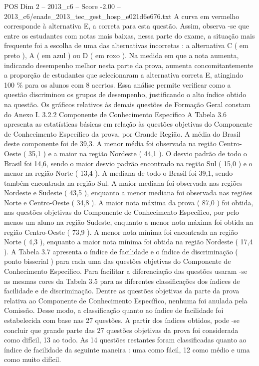\begin{textsample}{POS Dim 2 – 2013\_c6 – Score -2.00 – 2013\_c6/enade\_2013\_tec\_gest\_hosp\_e021d6e676.txt}
A curva em vermelho corresponde à alternativa E, a correta para esta questão.
Assim, observa -se que entre os estudantes com notas mais baixas, nessa parte do exame, a situação mais frequente foi a escolha de uma das alternativas incorretas : a alternativa C ( em preto ), A ( em azul ) ou D ( em roxo ).
Na medida em que a nota aumenta, indicando desempenho melhor nesta parte da prova, aumenta concomitantemente a proporção de estudantes que selecionaram a alternativa correta E, atingindo 100 \% para os alunos com 8 acertos.
Essa análise permite verificar como a questão discriminou os grupos de desempenho, justificando o alto índice obtido na questão.
Os gráficos relativos às demais questões de Formação Geral constam do Anexo I. 3.2.2 Componente de Conhecimento Específico A Tabela 3.6 apresenta as estatísticas básicas em relação às questões objetivas do Componente de Conhecimento Específico da prova, por Grande Região.
A média do Brasil deste componente foi de 39,3.
A menor média foi observada na região Centro-Oeste ( 35,1 ) e a maior na região Nordeste ( 44,1 ).
O desvio padrão de todo o Brasil foi 14,6, sendo o maior desvio padrão encontrado na região Sul ( 15,0 ) e o menor na região Norte ( 13,4 ).
A mediana de todo o Brasil foi 39,1, sendo também encontrada na região Sul.
A maior mediana foi observada nas regiões Nordeste e Sudeste ( 43,5 ), enquanto a menor mediana foi observada nas regiões Norte e Centro-Oeste ( 34,8 ).
A maior nota máxima da prova ( 87,0 ) foi obtida, nas questões objetivas do Componente de Conhecimento Específico, por pelo menos um aluno na região Sudeste, enquanto a menor nota máxima foi obtida na região Centro-Oeste ( 73,9 ).
A menor nota mínima foi encontrada na região Norte ( 4,3 ), enquanto a maior nota mínima foi obtida na região Nordeste ( 17,4 ).
A Tabela 3.7 apresenta o índice de facilidade e o índice de discriminação ( ponto bisserial ) para cada uma das questões objetivas do Componente de Conhecimento Específico.
Para facilitar a diferenciação das questões usaram -se as mesmas cores da Tabela 3.5 para as diferentes classificações dos índices de facilidade e de discriminação.
Dentre as questões objetivas da parte da prova relativa ao Componente de Conhecimento Específico, nenhuma foi anulada pela Comissão.
Desse modo, a classificação quanto ao índice de facilidade foi estabelecida com base nas 27 questões.
A partir dos índices obtidos, pode -se concluir que grande parte das 27 questões objetivas da prova foi considerada como difícil, 13 ao todo.
As 14 questões restantes foram classificadas quanto ao índice de facilidade da seguinte maneira : uma como fácil, 12 como médio e uma como muito difícil.

\end{textsample}
